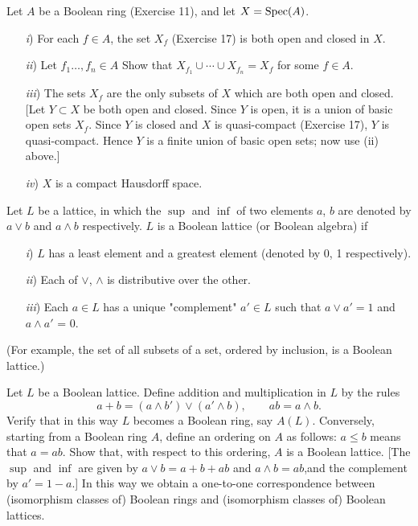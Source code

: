 \documentclass[10pt]{amsart}
\begin{document}
\begin{exercise}
    Let $A$ be a Boolean ring (Exercise 11), and let $X = \operatorname{Spec} (A)$.
    \begin{itemize}
        \item[\emph{i})] For each $f \in A$, the set $X_f$ (Exercise 17) is both open and closed in $X$. 
        \item[\emph{ii})] Let $f_1 \dots, f_n \in A$ Show that $X_{f_1} \cup \cdots \cup X_{f_n} = X_f$ for some $f \in A$.
        \item[\emph{iii})]  The sets $X_f$ are the only subsets of $X$ which are both open and closed. 
        [Let $Y \subset X$  be both open and closed. Since $Y$ is open, it is a union of basic open sets $X_f$. 
        Since $Y$ is closed and $X$ is quasi-compact (Exercise 17), $Y$ is quasi-compact. Hence $Y$ is a finite union of basic open sets; 
        now use (ii) above.]
        \item[\emph{iv})] $X$ is a compact Hausdorff space.
    \end{itemize}
\end{exercise}

\begin{exercise}
    Let $L$ be a lattice, in which the $\sup$ and $\inf$ of two elements $a$, $b$ are denoted by $a \vee b$ and $a  \wedge b$ respectively. $L$ is a Boolean lattice 
    (or Boolean algebra) if
    \begin{itemize}
        \item[\emph{i})] $L$ has a least element and a greatest element (denoted by 0, 1 respectively). 
        \item[\emph{ii})] Each of $\vee$, $\wedge$ is distributive over the other.
        \item[\emph{iii})] Each $a \in L$ has a unique "complement" $a' \in L$ such that $a \vee a' = 1$ and $a \wedge a'$ = 0.
    \end{itemize}
    (For example, the set of all subsets of a set, ordered by inclusion, is a Boolean lattice.)

    Let $L$ be a Boolean lattice. Define addition and multiplication in $L$ by the rules
    \[
    a + b = (a \wedge b') \vee (a' \wedge b), \qquad ab= a \wedge b.
    \]
    Verify that in this way $L$ becomes a Boolean ring, say $A(L)$.
    Conversely, starting from a Boolean ring $A$, define an ordering on $A$ as follows: 
    $a \le b$ means that $a = ab$. Show that, with respect to this ordering, $A$ is a Boolean lattice. 
    [The $\sup$ and $\inf$ are given by $a \vee b= a+b+ab$ and $a \wedge b = ab $,and the complement by 
    $a'=1- a.$] In this way we obtain a one-to-one correspondence between (isomorphism classes of) Boolean rings and
    (isomorphism classes of) Boolean lattices.
\end{exercise}
\end{document}
